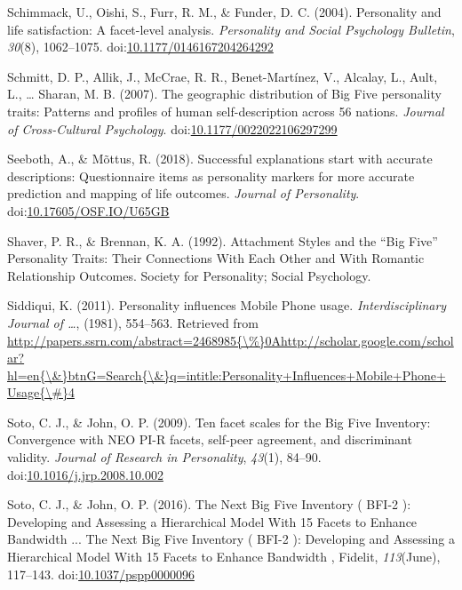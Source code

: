 \documentclass[,man,floatsintext]{apa6}
\begin{document}
\hypertarget{ref-Schimmack2004}{}
Schimmack, U., Oishi, S., Furr, R. M., \& Funder, D. C. (2004).
Personality and life satisfaction: A facet-level analysis.
\emph{Personality and Social Psychology Bulletin}, \emph{30}(8),
1062--1075.
doi:\href{https://doi.org/10.1177/0146167204264292}{10.1177/0146167204264292}

\hypertarget{ref-Schmitt2007}{}
Schmitt, D. P., Allik, J., McCrae, R. R., Benet-Martínez, V., Alcalay,
L., Ault, L., \ldots{} Sharan, M. B. (2007). The geographic distribution
of Big Five personality traits: Patterns and profiles of human
self-description across 56 nations. \emph{Journal of Cross-Cultural
Psychology}.
doi:\href{https://doi.org/10.1177/0022022106297299}{10.1177/0022022106297299}

\hypertarget{ref-Seeboth2018}{}
Seeboth, A., \& Mõttus, R. (2018). Successful explanations start with
accurate descriptions: Questionnaire items as personality markers for
more accurate prediction and mapping of life outcomes. \emph{Journal of
Personality}.
doi:\href{https://doi.org/10.17605/OSF.IO/U65GB}{10.17605/OSF.IO/U65GB}

\hypertarget{ref-Shaver1992}{}
Shaver, P. R., \& Brennan, K. A. (1992). Attachment Styles and the ``Big
Five'' Personality Traits: Their Connections With Each Other and With
Romantic Relationship Outcomes. Society for Personality; Social
Psychology.

\hypertarget{ref-Siddiqui2011}{}
Siddiqui, K. (2011). Personality influences Mobile Phone usage.
\emph{Interdisciplinary Journal of \ldots{}}, (1981), 554--563.
Retrieved from
\href{http://papers.ssrn.com/abstract=2468985\%7B/\%\%7D0Ahttp://scholar.google.com/scholar?hl=en\%7B/\&\%7DbtnG=Search\%7B/\&\%7Dq=intitle:Personality+Influences+Mobile+Phone+Usage\%7B/\#\%7D4}{http://papers.ssrn.com/abstract=2468985\{\textbackslash{}\%\}0Ahttp://scholar.google.com/scholar?hl=en\{\textbackslash{}\&\}btnG=Search\{\textbackslash{}\&\}q=intitle:Personality+Influences+Mobile+Phone+Usage\{\textbackslash{}\#\}4}

\hypertarget{ref-SotoJohn2009}{}
Soto, C. J., \& John, O. P. (2009). Ten facet scales for the Big Five
Inventory: Convergence with NEO PI-R facets, self-peer agreement, and
discriminant validity. \emph{Journal of Research in Personality},
\emph{43}(1), 84--90.
doi:\href{https://doi.org/10.1016/j.jrp.2008.10.002}{10.1016/j.jrp.2008.10.002}

\hypertarget{ref-SotoJohn2016}{}
Soto, C. J., \& John, O. P. (2016). The Next Big Five Inventory ( BFI-2
): Developing and Assessing a Hierarchical Model With 15 Facets to
Enhance Bandwidth ... The Next Big Five Inventory ( BFI-2 ): Developing
and Assessing a Hierarchical Model With 15 Facets to Enhance Bandwidth ,
Fidelit, \emph{113}(June), 117--143.
doi:\href{https://doi.org/10.1037/pspp0000096}{10.1037/pspp0000096}
\end{document}

